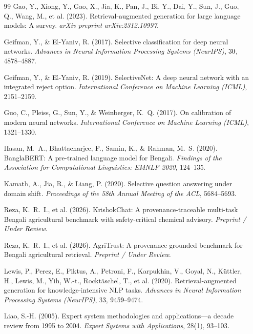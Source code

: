 \documentclass[11pt,a4paper]{article}
\begin{document}
\begin{thebibliography}{99}
 Gao, Y., Xiong, Y., Gao, X., Jia, K., Pan, J., Bi, Y., Dai, Y., Sun, J., Guo, Q., Wang, M., et al. (2023). Retrieval-augmented generation for large language models: A survey. \textit{arXiv preprint arXiv:2312.10997}.

 Geifman, Y., \& El-Yaniv, R. (2017). Selective classification for deep neural networks. \textit{Advances in Neural Information Processing Systems (NeurIPS)}, 30, 4878--4887.

 Geifman, Y., \& El-Yaniv, R. (2019). SelectiveNet: A deep neural network with an integrated reject option. \textit{International Conference on Machine Learning (ICML)}, 2151--2159.

 Guo, C., Pleiss, G., Sun, Y., \& Weinberger, K.~Q. (2017). On calibration of modern neural networks. \textit{International Conference on Machine Learning (ICML)}, 1321--1330.

 Hasan, M.~A., Bhattacharjee, F., Samin, K., \& Rahman, M.~S. (2020). BanglaBERT: A pre-trained language model for Bengali. \textit{Findings of the Association for Computational Linguistics: EMNLP 2020}, 124--135.

 Kamath, A., Jia, R., \& Liang, P. (2020). Selective question answering under domain shift. \textit{Proceedings of the 58th Annual Meeting of the ACL}, 5684--5693.

 Reza, K.~R.~I., et al. (2026). KrishokChat: A provenance-traceable multi-task Bengali agricultural benchmark with safety-critical chemical advisory. \textit{Preprint / Under Review}.

 Reza, K.~R.~I., et al. (2026). AgriTrust: A provenance-grounded benchmark for Bengali agricultural retrieval. \textit{Preprint / Under Review}.

 Lewis, P., Perez, E., Piktus, A., Petroni, F., Karpukhin, V., Goyal, N., K{\"u}ttler, H., Lewis, M., Yih, W.-t., Rockt{\"a}schel, T., et al. (2020). Retrieval-augmented generation for knowledge-intensive NLP tasks. \textit{Advances in Neural Information Processing Systems (NeurIPS)}, 33, 9459--9474.

 Liao, S.-H. (2005). Expert system methodologies and applications---a decade review from 1995 to 2004. \textit{Expert Systems with Applications}, 28(1), 93--103.


\end{thebibliography}
\end{document}
